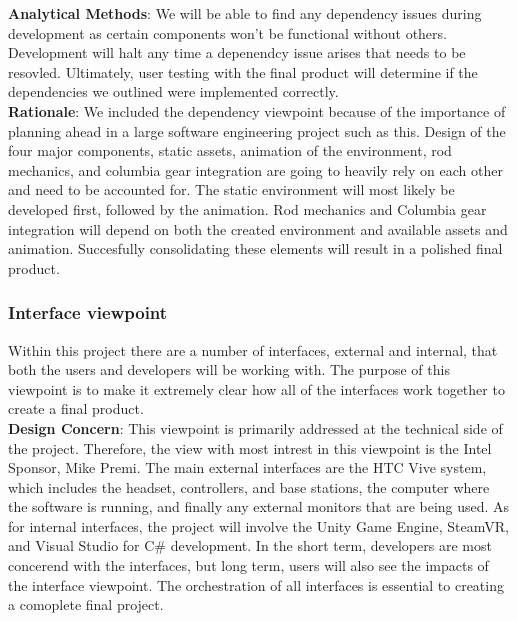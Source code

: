\documentclass[10pt,journal,compsoc,onecolumn, draftclsnofoot]{IEEEtran}
\begin{document}
\hangindent=0.5cm \textbf{Analytical Methods}: We will be able to find any dependency issues during development as certain components won't be functional without others. Development will halt any time a depenendcy issue arises that needs to be resovled. Ultimately, user testing with the final product will determine if the dependencies we outlined were implemented correctly.\\

\hangindent=0.5cm \textbf{Rationale}: We included the dependency viewpoint because of the importance of planning ahead in a large software engineering project such as this. Design of the four major components, static assets, animation of the environment, rod mechanics, and columbia gear integration are going to heavily rely on each other and need to be accounted for. The static environment will most likely be developed first, followed by the animation. Rod mechanics and Columbia gear integration will depend on both the created environment and available assets and animation. Succesfully consolidating these elements will result in a polished final product.\\

\subsubsection{Interface viewpoint}
Within this project there are a number of interfaces, external and internal, that both the users and developers will be working with.
The purpose of this viewpoint is to make it extremely clear how all of the interfaces work together to create a final product. \\

\hangindent=0.5cm \textbf{Design Concern}: This viewpoint is primarily addressed at the technical side of the project.
Therefore, the view with most intrest in this viewpoint is the Intel Sponsor, Mike Premi.
The main external interfaces are the HTC Vive system, which includes the headset, controllers, and base stations, the computer where the software is running, and finally any external monitors that are being used.
As for internal interfaces, the project will involve the Unity Game Engine, SteamVR, and Visual Studio for C\# development.
In the short term, developers are most concerend with the interfaces, but long term, users will also see the impacts of the interface viewpoint.
The orchestration of all interfaces is essential to creating a comoplete final project. \\
\end{document}
